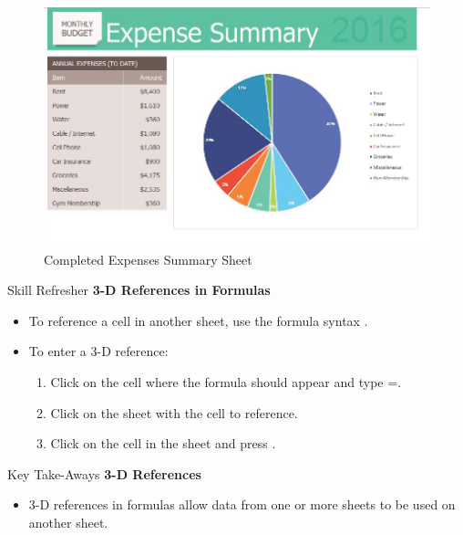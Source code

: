 \begin{figure}[H]
	\centering
	\includegraphics[width=\maxwidth{.95\linewidth}]{gfx/ch06_fig08}
	\caption{Completed Expenses Summary Sheet}
	\label{06:fig08}
\end{figure}

\begin{center}
	\begin{sklbox}{Skill Refresher}
		\textbf{3-D References in Formulas}
		\\
		\begin{itemize}
			\setlength{\itemsep}{0pt}
			\setlength{\parskip}{0pt}
			\setlength{\parsep}{0pt}
			
			\item To reference a cell in another sheet, use the formula syntax .
			\bigskip
			\item To enter a 3-D reference:

			\begin{enumerate}
				\item Click on the cell where the formula should appear and type =.
				\item Click on the sheet with the cell to reference.
				\item Click on the cell in the sheet and press .
			\end{enumerate}
			
		\end{itemize}
	\end{sklbox}
\end{center}

\begin{center}
	\begin{tkwbox}{Key Take-Aways}
		\textbf{3-D References}
		\\
		\begin{itemize}
			\setlength{\itemsep}{0pt}
			\setlength{\parskip}{0pt}
			\setlength{\parsep}{0pt}
			
			\item 3-D references in formulas allow data from one or more sheets to be used on another sheet.
			
		\end{itemize}
	\end{tkwbox}
\end{center}

